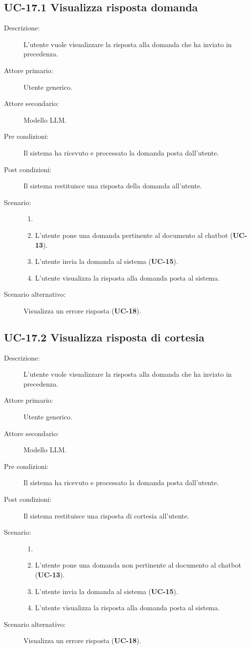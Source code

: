 \subsection{UC-17.1 Visualizza risposta domanda}
\begin{description}
    \item[Descrizione:] L'utente vuole visualizzare la risposta alla domanda che ha inviato in precedenza.
    \item[Attore primario:] Utente generico.
    \item[Attore secondario:] Modello LLM. 
    \item[Pre condizioni:] Il sistema ha ricevuto e processato la domanda posta dall'utente.
    \item[Post condizioni:] Il sistema restituisce una risposta della domanda all'utente.
    \item[Scenario:]
    \begin{enumerate}
        \item[]
        \item L’utente pone una domanda pertinente al documento al chatbot (\textbf{UC-13}).
        \item L'utente invia la domanda al sistema (\textbf{UC-15}).
        \item L'utente visualizza la risposta alla domanda posta al sistema.
    \end{enumerate}
    \item[Scenario alternativo:] Visualizza un errore risposta (\textbf{UC-18}).
\end{description}

\subsection{UC-17.2 Visualizza risposta di cortesia}
\begin{description}
    \item[Descrizione:] L'utente vuole visualizzare la risposta alla domanda che ha inviato in precedenza.
    \item[Attore primario:] Utente generico.
    \item[Attore secondario:] Modello LLM. 
    \item[Pre condizioni:] Il sistema ha ricevuto e processato la domanda posta dall'utente.
    \item[Post condizioni:] Il sistema restituisce una risposta di cortesia all'utente.
    \item[Scenario:]
    \begin{enumerate}
        \item[]
        \item L’utente pone una domanda non pertinente al documento al chatbot (\textbf{UC-13}).
        \item L'utente invia la domanda al sistema (\textbf{UC-15}).
        \item L'utente visualizza la risposta alla domanda posta al sistema.
    \end{enumerate}
    \item[Scenario alternativo:] Visualizza un errore risposta (\textbf{UC-18}).
\end{description}

